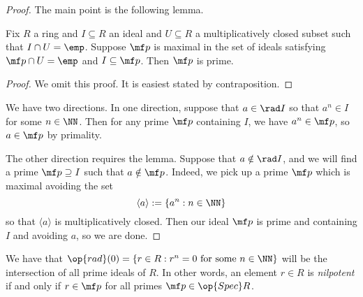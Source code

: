 \begin{proof}
	The main point is the following lemma.
	\begin{lemma}
		Fix $R$ a ring and $I\subseteq R$ an ideal and $U\subseteq R$ a multiplicatively closed subset such that $I\cap U=\emp$. Suppose $\mf p$ is maximal in the set of ideals satisfying $\mf p\cap U=\emp$ and $I\subseteq\mf p$. Then $\mf p$ is prime.
	\end{lemma}
	\begin{proof}
		We omit this proof. It is easiest stated by contraposition.
	\end{proof}
	We have two directions. In one direction, suppose that $a\in\rad I$ so that $a^n\in I$ for some $n\in\NN$. Then for any prime $\mf p$ containing $I$, we have $a^n\in\mf p$, so $a\in\mf p$ by primality.

	The other direction requires the lemma. Suppose that $a\notin\rad I$, and we will find a prime $\mf p\supseteq I$ such that $a\notin\mf p$. Indeed, we pick up a prime $\mf p$ which is maximal avoiding the set
	\[\langle a\rangle:=\{a^n:n\in\NN\}\]
	so that $\langle a\rangle$ is multiplicatively closed. Then our ideal $\mf p$ is prime and containing $I$ and avoiding $a$, so we are done.
\end{proof}
\begin{example}
	We have that $\op{rad}(0)=\{r\in R:r^n=0\text{ for some }n\in\NN\}$ will be the intersection of all prime ideals of $R$. In other words, an element $r\in R$ is \textit{nilpotent} if and only if $r\in\mf p$ for all primes $\mf p\in\op{Spec}R$.
\end{example}